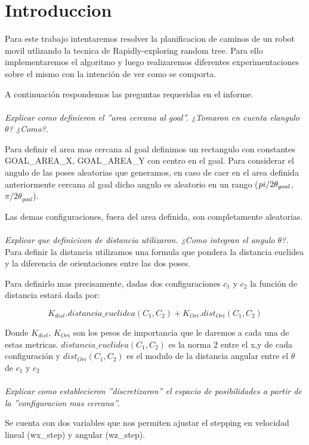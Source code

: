 \section{Introduccion}
Para este trabajo intentaremos resolver la planificacion de caminos de un robot movil utlizando la tecnica de Rapidly-exploring random tree. Para ello implementaremos el algoritmo y luego realizaremos diferentes experimentaciones sobre el mismo con la intención de ver como se comporta.

A continuación respondemos las preguntas requeridas en el informe.
\\
\\
\textit{Explicar como definieron el ”area cercana al goal”. ¿Tomaron en cuenta elangulo $\theta$? ¿Como?.}


Para definir el area mas cercana al goal definimos un rectangulo con constantes GOAL\_AREA\_X, GOAL\_AREA\_Y con centro en el goal.  Para considerar el angulo de las poses aleatorias que generamos, en caso de caer en el area definida anteriormente cercana al goal dicho angulo es aleatorio en un rango ($\-pi/2\theta_{goal}$, $\pi/2 \theta_{goal}$).

Las demas configuraciones, fuera del area definida, son completamente aleatorias.
\\
\\
\textit{Explicar que definicicon de distancia utilizaron. ¿Como integran el angulo $\theta$?.}
\\Para definir la distancia utilizamos una formula que pondera la distancia euclidea y la diferencia de orientaciones entre las dos poses.

Para definirlo mas precisamente, dadas dos configuraciones $c_1$ y $c_2$ la función de distancia estará dada por:

$$K_{dist}. distancia\_euclidea(C_1,C_2) + K_{Ori}. dist_{Ori}(C_1,C_2) $$

Donde $K_{dist}$, $K_{Ori}$ son los pesos de importancia que le daremos a cada una de estas metricas. $distancia\_euclidea(C_1,C_2)$ es la norma 2 entre el x,y de cada configuración y $dist_{Ori}(C_1,C_2)$ es el modulo de la distancia angular entre el $\theta$ de $c_1$ y $c_2$ 
\\
\\
\textit{Explicar como establecieron ”discretizaron” el espacio de posibilidades a partir de la ”configuracion mas cercana”.}

Se cuenta con dos variables que nos permiten ajustar el stepping en velocidad lineal (wx\_step) y angular (wz\_step).


